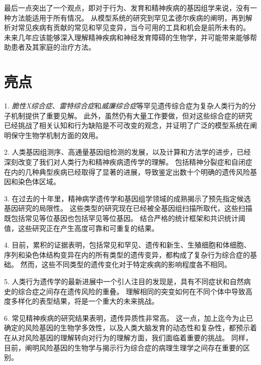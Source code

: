 最后一点突出了一个观点，即对于行为、发育和精神疾病的基因组学来说，没有一种方法能适用于所有情况。
从模型系统的研究到罕见孟德尔疾病的阐明，再到解析对常见疾病有贡献的常见和罕见变异，当今可用的工具和机会是前所未有的。
未来几年应该能够深入理解精神疾病和神经发育障碍的生物学，并可能带来能够帮助患者及其家庭的治疗方法。


\section{亮点}

1. \textit{脆性X综合症}、\textit{雷特综合症}和\textit{威廉综合症}等罕见遗传综合症为复杂人类行为的分子机制提供了重要见解。 
此外，虽然仍有大量工作要做，但对这些综合症的研究已经挑战了相关认知和行为缺陷是不可改变的观念，并证明了广泛的模型系统在阐明保守生物学机制方面的效用。


2. 人类基因组测序、高通量基因组检测的发展，以及计算和方法学的进步，已经深刻改变了我们对人类行为和精神疾病遗传学的理解。
包括精神分裂症和自闭症在内的几种典型疾病已经取得了显著的进展，导致鉴定出数十个明确的遗传风险基因和染色体区域。



3. 在过去的十年里，精神病学遗传学和基因组学领域的成熟揭示了预先指定候选基因研究的局限性。
这些类型的研究现在已经被全基因组扫描所取代，这些扫描既包括常见等位基因也包括罕见等位基因。
结合严格的统计框架和共识统计阈值，这些研究正在产生高度可靠和可重复的结果。


4. 目前，累积的证据表明，包括常见和罕见、遗传和新生、生殖细胞和体细胞、序列和染色体结构变异在内的所有类型的遗传变异，都构成了复杂行为综合症的基础。
然而，这些不同类型的遗传变化对于特定疾病的影响程度各不相同。

5. 
人类行为遗传学的最新进展中一个引人注目的发现是，具有不同症状和自然病史的综合症之间存在遗传风险的重叠。
理解相同的突变如何在不同个体中导致高度多样化的表型结果，将是一个重大的未来挑战。


6. 常见精神疾病的研究结果表明，遗传异质性非常高。
这一点，加上迄今为止已确定的风险基因的生物学多效性，以及人类大脑发育的动态性和复杂性，都预示着在从对风险基因的理解转向对行为的理解方面，我们面临着重要的挑战。
同样，目前，阐明风险基因的生物学与揭示行为综合症的病理生理学之间存在重要的区别。






